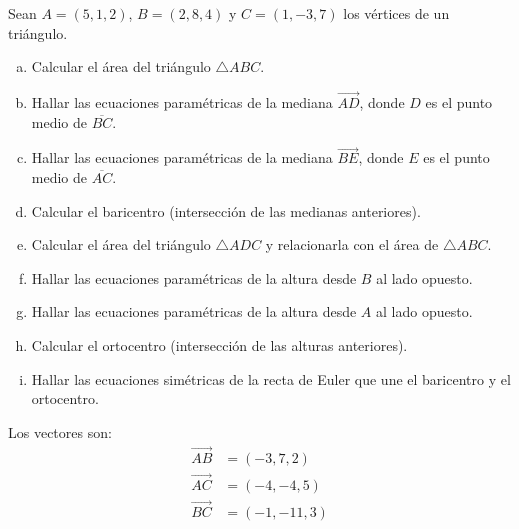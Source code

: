 \begin{prob} 
Sean $A=(5,1,2)$, $B=(2,8,4)$ y $C=(1,-3,7)$ los vértices de un triángulo.

\begin{enumerate}[a)]
\item Calcular el área del triángulo $\triangle ABC$.
\item Hallar las ecuaciones paramétricas de la mediana $\overrightarrow{AD}$, donde $D$ es el punto medio de $\overline{BC}$.
\item Hallar las ecuaciones paramétricas de la mediana $\overrightarrow{BE}$, donde $E$ es el punto medio de $\overline{AC}$.
\item Calcular el baricentro (intersección de las medianas anteriores).
\item Calcular el área del triángulo $\triangle ADC$ y relacionarla con el área de $\triangle ABC$.
\item Hallar las ecuaciones paramétricas de la altura desde $B$ al lado opuesto.
\item Hallar las ecuaciones paramétricas de la altura desde $A$ al lado opuesto.
\item Calcular el ortocentro (intersección de las alturas anteriores).
\item Hallar las ecuaciones simétricas de la recta de Euler que une el baricentro y el ortocentro.
\end{enumerate}

\begin{myproof}
\begin{multicols}{2}
\begin{figure}[H]
\centering
{}
\end{figure}

Los vectores son:
\begin{align*}
\overrightarrow{AB} &= (-3,7,2) \\
\overrightarrow{AC} &= (-4,-4,5) \\
\overrightarrow{BC} &= (-1,-11,3)
\end{align*}
\end{multicols}


\end{myproof}
\end{prob}
